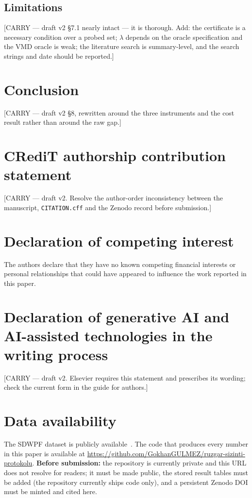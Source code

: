 \documentclass[review,3p,times]{elsarticle}
\newcommand{\carry}[1]{\textsf{\small [CARRY --- #1]}}
\begin{document}
\subsection{Limitations}\label{sec:limits}
\carry{draft v2 §7.1 nearly intact --- it is thorough. Add: the certificate is
a necessary condition over a probed set; $\lambda$ depends on the oracle
specification and the VMD oracle is weak; the literature search is
summary-level, and the search strings and date should be reported.}

\section{Conclusion}\label{sec:conclusion}
\carry{draft v2 §8, rewritten around the three instruments and the cost
result rather than around the raw gap.}

\section*{CRediT authorship contribution statement}
\carry{draft v2. Resolve the author-order inconsistency between the
manuscript, \texttt{CITATION.cff} and the Zenodo record before submission.}

\section*{Declaration of competing interest}
The authors declare that they have no known competing financial interests or
personal relationships that could have appeared to influence the work reported
in this paper.

\section*{Declaration of generative AI and AI-assisted technologies in the
writing process}
\carry{draft v2. Elsevier requires this statement and prescribes its wording;
check the current form in the guide for authors.}

\section*{Data availability}
The SDWPF dataset is publicly available~\cite{zhou2024sdwpf}. The code that
produces every number in this paper is available at
\url{https://github.com/GokhanGULMEZ/ruzgar-sizinti-protokolu}.
\textbf{Before submission:} the repository is currently private and this URL
does not resolve for readers; it must be made public, the stored result tables
must be added (the repository currently ships code only), and a persistent
Zenodo DOI must be minted and cited here.
\end{document}
